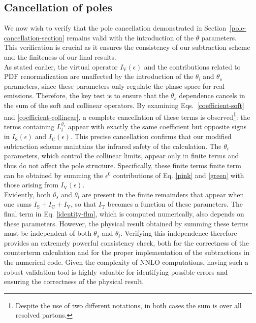 \documentclass[a4paper, 12pt]{book}
\begin{document}
\subsection{Cancellation of poles}
We now wish to verify that the pole cancellation demonstrated in Section~\ref{pole-cancellation-section} remains valid with the introduction of the $\theta$ parameters. This verification is crucial as it ensures the consistency of our subtraction scheme and the finiteness of our final results. \\ As stated earlier, the virtual operator $I_{\mathrm{V}}(\epsilon)$ and the contributions related to PDF renormalization are unaffected by the introduction of the $\theta_i$ and $\theta_s$ parameters, since these parameters only regulate the phase space for real emissions. Therefore, the key test is to ensure that the $\theta_s$ dependence cancels in the sum of the soft and collinear operators. By examining Eqs.~\ref{coefficient-soft} and \ref{coefficient-collinear}, a complete cancellation of these terms is observed\footnote{Despite the use of two different notations, in both cases the sum is over all resolved partons.}: the terms containing $L_i^{\theta_s}$ appear with exactly the same coefficient but opposite signs in $I_{\mathrm{S}}(\epsilon)$ and $I_{\mathrm{C}}(\epsilon)$. This precise cancellation confirms that our modified subtraction scheme maintains the infrared safety of the calculation. 
The $\theta_i$ parameters, which control the collinear limits, appear only in finite terms and thus do not affect the pole structure. Specifically, these finite terms finite term can be obtained by summing the $\epsilon^0$ contributions of Eq. \ref{pink} and \ref{green} with those arising from $I_{\mathrm{V}}(\epsilon)$. \\
Evidently, both $\theta_s$ and $\theta_i$ are present in the finite remainders that appear when one sums $I_{\mathrm{S}}+I_{\mathrm{C}}+I_{\mathrm{V}}$, so that $I_{\mathrm{T}}$ becomes a function of these parameters. The final term in Eq. \ref{identity-flm}, which is computed numerically, also depends on these parameters. However, the physical result obtained by summing these terms must be independent of both $\theta_s$ and $\theta_i$. Verifying this independence therefore provides an extremely powerful consistency check, both for the correctness of the counterterm calculation and for the proper implementation of the subtractions in the numerical code. Given the complexity of NNLO computations, having such a robust validation tool is highly valuable for identifying possible errors and ensuring the correctness of the physical result. \\
\end{document}
